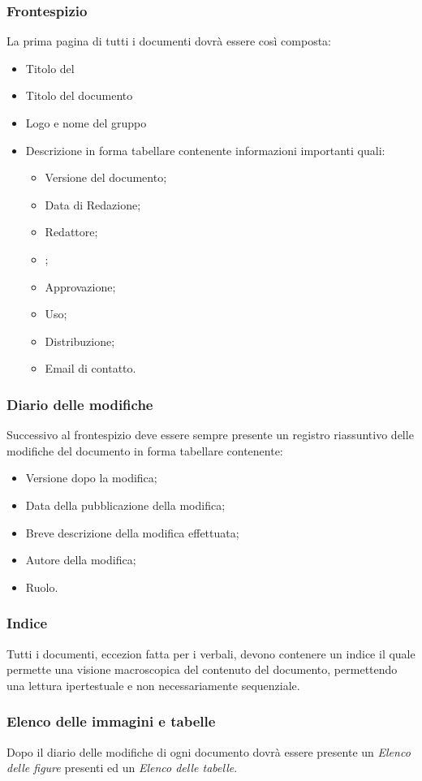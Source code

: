 \subsubsection{Frontespizio}
La prima pagina di tutti i documenti dovrà essere così composta:
\begin{itemize}
	\item Titolo del
	\item Titolo del documento
	\item Logo e nome del gruppo
	\item Descrizione in forma tabellare contenente informazioni importanti quali:
	\begin{itemize}
		\item Versione del documento;
		\item Data di Redazione;
		\item Redattore;
		\item {};
		\item Approvazione;
		\item Uso;
		\item Distribuzione;
		\item Email di contatto.
	\end{itemize}
\end{itemize}

\subsubsection{Diario delle modifiche}
Successivo al frontespizio deve essere sempre presente un registro riassuntivo delle modifiche del documento in forma tabellare contenente:
\begin{itemize}
\item Versione dopo la modifica;
\item Data della pubblicazione della modifica;
\item Breve descrizione della modifica effettuata;
\item Autore della modifica;
\item Ruolo.
\end{itemize}
\subsubsection{Indice}
Tutti i documenti, eccezion fatta per i verbali, devono contenere un indice il quale permette una visione macroscopica del contenuto del documento,
permettendo una lettura ipertestuale e non necessariamente sequenziale.
 \subsubsection{Elenco delle immagini e tabelle} 
Dopo il diario delle modifiche di ogni documento dovrà essere presente un \textit{Elenco delle figure} presenti ed un \textit{Elenco delle tabelle}.

